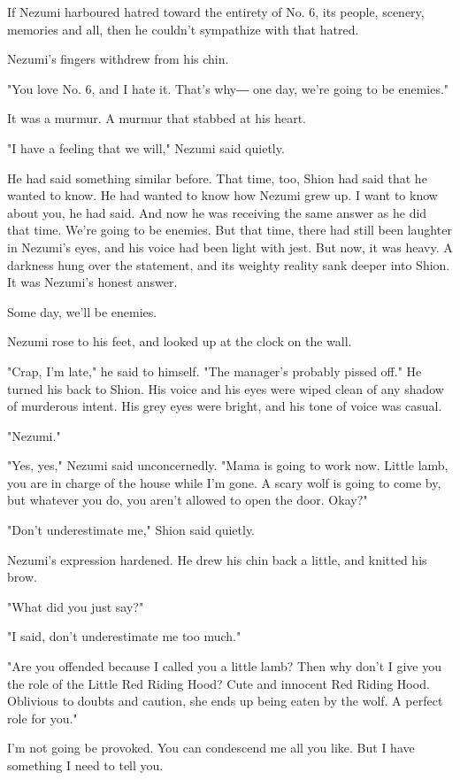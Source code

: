If Nezumi harboured hatred toward the entirety of No. 6, its people,
scenery, memories and all, then he couldn't sympathize with that hatred.

Nezumi's fingers withdrew from his chin.

"You love No. 6, and I hate it. That's why― one day, we're going to be
enemies."

It was a murmur. A murmur that stabbed at his heart.

"I have a feeling that we will," Nezumi said quietly.

He had said something similar before. That time, too, Shion had said
that he wanted to know. He had wanted to know how Nezumi grew up. I want
to know about you, he had said. And now he was receiving the same answer
as he did that time. We're going to be enemies. But that time, there had
still been laughter in Nezumi's eyes, and his voice had been light with
jest. But now, it was heavy. A darkness hung over the statement, and its
weighty reality sank deeper into Shion. It was Nezumi's honest answer.

Some day, we'll be enemies.

Nezumi rose to his feet, and looked up at the clock on the wall.

"Crap, I'm late," he said to himself. "The manager's probably pissed
off." He turned his back to Shion. His voice and his eyes were wiped
clean of any shadow of murderous intent. His grey eyes were bright, and
his tone of voice was casual.

"Nezumi."

"Yes, yes," Nezumi said unconcernedly. "Mama is going to work now.
Little lamb, you are in charge of the house while I'm gone. A scary wolf
is going to come by, but whatever you do, you aren't allowed to open the
door. Okay?"

"Don't underestimate me," Shion said quietly.

Nezumi's expression hardened. He drew his chin back a little, and
knitted his brow.

"What did you just say?"

"I said, don't underestimate me too much."

"Are you offended because I called you a little lamb? Then why don't I
give you the role of the Little Red Riding Hood? Cute and innocent Red
Riding Hood. Oblivious to doubts and caution, she ends up being eaten by
the wolf. A perfect role for you."

I'm not going be provoked. You can condescend me all you like. But I
have something I need to tell you.

